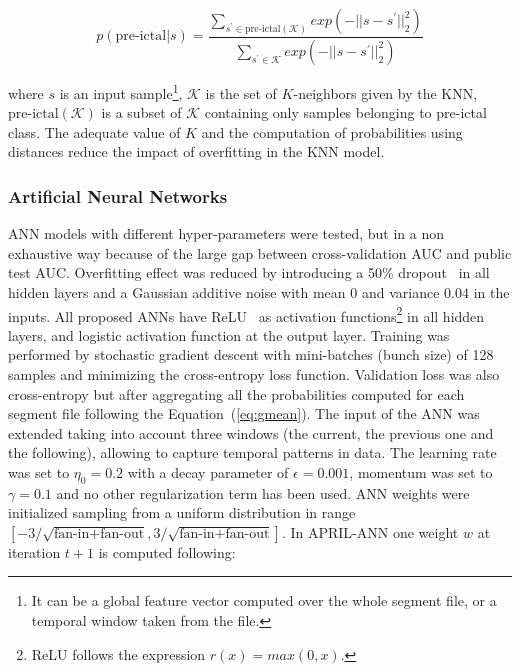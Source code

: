 \documentclass[a4paper,english,twoside]{article}
\begin{document}
\begin{equation}
p(\text{pre-ictal} | s) =
\displaystyle{\frac{\displaystyle{\sum_{ s^\prime \in \text{pre-ictal}(\mathcal{K}) } exp( -||s - s^\prime||^2_2 ) }}
{\displaystyle{\sum_{s^\prime \in \mathcal{K}} exp( -||s - s^\prime||^2_2 ) }}}
\end{equation}

\noindent where $s$ is an input sample\footnote{It can be a global feature
  vector computed over the whole segment file, or a temporal window taken from
  the file.}, $\mathcal{K}$ is the set of $K$-neighbors given by the KNN,
$\text{pre-ictal}(\mathcal{K})$ is a subset of $\mathcal{K}$ containing only
samples belonging to pre-ictal class. The adequate value of $K$ and the
computation of probabilities using distances reduce the impact of overfitting in
the KNN model.

\subsubsection{Artificial Neural
  Networks}\label{artificial-neural-networks}

ANN models with different hyper-parameters were tested, but in a non exhaustive
way because of the large gap between cross-validation AUC and public test
AUC. Overfitting effect was reduced by introducing a 50\%
dropout~\cite{2012:arxiv:hinton:dropout} in all hidden layers and a Gaussian
additive noise with mean $0$ and variance $0.04$ in the inputs. All proposed
ANNs have ReLU~\cite{2011:glorot:aistats} as activation functions\footnote{ReLU
  follows the expression $r(x) = max(0,x)$.} in all hidden layers, and logistic
activation function at the output layer. Training was performed by stochastic
gradient descent with mini-batches (bunch size) of 128 samples and minimizing
the cross-entropy loss function. Validation loss was also cross-entropy but
after aggregating all the probabilities computed for each segment file following
the Equation~(\ref{eq:gmean}). The input of the ANN was extended taking into
account three windows (the current, the previous one and the following),
allowing to capture temporal patterns in data. The learning rate was set to
$\eta_0=0.2$ with a decay parameter of $\epsilon=0.001$, momentum was set to
$\gamma=0.1$ and no other regularization term has been used. ANN weights were
initialized sampling from a uniform distribution in range $[-3/\sqrt{\text{fan-in} +
  \text{fan-out}},3/\sqrt{\text{fan-in} + \text{fan-out}}]$. In APRIL-ANN one weight
$w$ at iteration $t+1$ is computed following:
\end{document}
